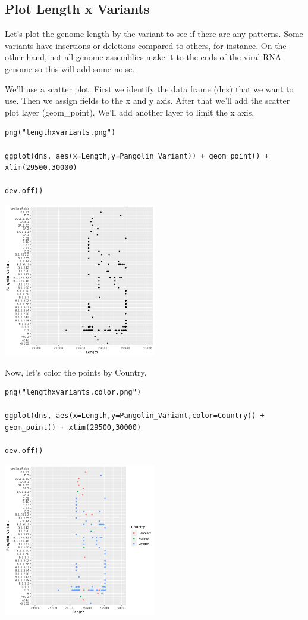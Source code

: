 \documentclass[
]{book}
\begin{document}
\hypertarget{plot-length-x-variants}{%
\subsection{Plot Length x Variants}\label{plot-length-x-variants}}

Let's plot the genome length by the variant to see if there are any patterns. Some variants have insertions or deletions compared to others, for instance. On the other hand, not all genome assemblies make it to the ends of the viral RNA genome so this will add some noise.

We'll use a scatter plot. First we identify the data frame (dns) that we want to use. Then we assign fields to the x and y axis. After that we'll add the scatter plot layer (geom\_point). We'll add another layer to limit the x axis.

\begin{verbatim}
png("lengthxvariants.png")

ggplot(dns, aes(x=Length,y=Pangolin_Variant)) + geom_point() + xlim(29500,30000)

dev.off()
\end{verbatim}

\includegraphics[width=0.5\textwidth,height=\textheight]{./Figures/lengthxvariants.png}

Now, let's color the points by Country.

\begin{verbatim}
png("lengthxvariants.color.png")

ggplot(dns, aes(x=Length,y=Pangolin_Variant,color=Country)) + geom_point() + xlim(29500,30000)

dev.off()
\end{verbatim}

\includegraphics[width=0.5\textwidth,height=\textheight]{./Figures/lengthxvariants.color.png}
\end{document}
